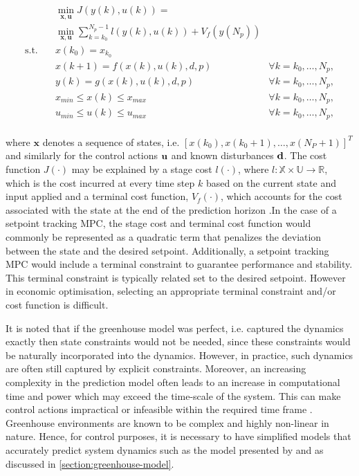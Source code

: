 \begin{equation}
	\begin{aligned}
		& \min_{\mathbf{x},\mathbf{u}} J(y(k),u(k)) = \\ 
		& \min_{\mathbf{x},\mathbf{u}} \sum_{k=k_0}^{N_p-1} l(y(k),u(k)) + V_f(y(N_p))  \\
		\text{s.t.} \quad  & x(k_0) = x_{k_0}                             &\\
		& x(k+1) = f(x(k),u(k),d, p)       & \forall k = k_0,\hdots, N_p,\\
		& y(k) = g(x(k),u(k),d,p)                 & \forall k = k_0,\hdots, N_p,\\
		& x_{min} \leq x(k) \leq x_{max}                  & \forall k = k_0,\hdots, N_p,\\
		& u_{min} \leq u(k) \leq u_{max}                  & \forall k = k_0,\hdots, N_p,\\
	\end{aligned}
	\label{eq:mcp ocp}
\end{equation}

where $\mathbf{x}$ denotes a sequence of states, i.e. $[x(k_0), x(k_0+1), \hdots, x(N_P+1)]^T$  and similarly for the control actions $\bold{u}$ and known disturbances $\bold{d}$. The cost function $J(\cdot)$ may be explained by a stage cost $l(\cdot)$, where $l: \mathbb X \times \mathbb U \rightarrow \mathbb R$, which is the cost incurred at every time step $k$ based on the current state and input applied and a terminal cost function, $V_f(\cdot)$, which accounts for the cost associated with the state at the end of the prediction horizon \cite{daiDiscreteTimeModelPredictive2012,boersmaRobustSamplebasedModel2022}.In the case of a setpoint tracking MPC, the stage cost and terminal cost function would commonly be represented as a quadratic term that penalizes the deviation between the state and the desired setpoint. Additionally, a setpoint tracking MPC would include a terminal constraint to guarantee performance and stability. This terminal constraint is typically related set to the desired setpoint. However in economic optimisation, selecting an appropriate terminal constraint and/or cost function is difficult.

It is noted that if the greenhouse model was perfect, i.e. captured the dynamics exactly then state constraints would not be needed, since these constraints would be naturally incorporated into the dynamics. However, in practice, such dynamics are often still captured by explicit constraints. Moreover, an increasing complexity in the prediction model often leads to an increase in computational time and power which may exceed the time-scale of the system. This can make control actions impractical or infeasible within the required time frame \cite{rawlingsModelPredictiveControl2017}. Greenhouse environments are known to be complex and highly non-linear in nature. Hence, for control purposes,  it is necessary to have simplified models that accurately predict system dynamics such as the model presented by \citet{hentenGreenhouseClimateManagement1994} and as discussed in \autoref{section:greenhouse-model}. 

